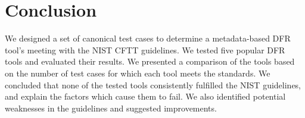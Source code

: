 \section{Conclusion}

We designed a set of canonical test cases to determine a metadata-based DFR tool's meeting with the NIST CFTT guidelines.
We tested five popular DFR tools and evaluated their results.
We presented a comparison of the tools based on the number of test cases for which each tool meets the standards.
We concluded that none of the tested tools consistently fulfilled the NIST guidelines, and explain the factors which cause them to fail.
We also identified potential weaknesses in the guidelines and suggested improvements.

